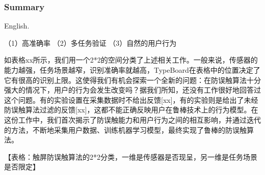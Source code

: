 
\subsubsection{Summary}

English.

（1）高准确率
（2）多任务验证
（3）自然的用户行为

如表格xx所示，我们用一个2*2的空间分类了上述相关工作。一般来说，传感器的能力越强，任务场景越窄，识别准确率就越高，TypeBoard在表格中的位置决定了它有很高的识别上限。这使得我们有机会探索一个全新的问题：在防误触算法十分强大的情况下，用户的行为会发生改变吗？据我们所知，还没有工作很好地回答过这个问题。有的实验设置在采集数据时不给出反馈[xx]，有的实验则是给出了未经防误触算法过滤的反馈[xx]，这都不能正确反映用户在鲁棒技术上的行为模型。在这份工作中，我们首次揭示了防误触能力和用户行为之间的相互影响，并通过迭代的方法，不断地采集用户数据、训练机器学习模型，最终实现了鲁棒的防误触算法。

【表格：触屏防误触算法的2*2分类，一维是传感器是否现呈，另一维是任务场景是否限定】

